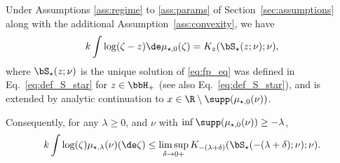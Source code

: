 \begin{lemma}
\label{lemma:log_pot_z}
Under Assumptions \ref{ass:regime} to \ref{ass:params} of Section~\ref{sec:assumptions} along with
the additional Assumption~\ref{ass:convexity}, we have
    \begin{equation}
    \label{eq:log_pot}
        k\int\log(\zeta - z) \de \mu_{\star,0}(\zeta)
=  K_z(\bS_\star(z;\nu);\nu),
    \end{equation}  
where 
$\bS_\star(z;\nu)$ is the unique solution of \eqref{eq:fp_eq} 
was defined in Eq.~\eqref{eq:def_S_star} for $z\in\bbH_+$
(see also Eq.~\eqref{eq:def_S_star}), and is extended by analytic continuation to $x\in\R \setminus \supp(\mu_{\star,0}(\nu))$.


Consequently, for any $\lambda \ge 0$, and $\nu$ with $\inf\supp(\mu_{\star,0}(\nu))\ge -\lambda$,
\begin{equation}
\label{eq:log_pot_0}
k\int \log(\zeta )\mu_{\star,\lambda}(\nu)(\de\zeta) \le  \limsup_{\delta \to 0+}K_{-(\lambda+\delta)}(\bS_{\star}(-(\lambda+\delta);\nu);\nu).
\end{equation}
\end{lemma}
